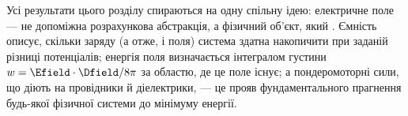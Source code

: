 \begin{Attention}
	Усі результати цього розділу спираються на одну спільну ідею: електричне поле --- не допоміжна розрахункова абстракція, а фізичний об'єкт, який
	. Ємність описує, скільки заряду (а отже, і поля) система здатна накопичити при заданій різниці потенціалів; енергія
	поля визначається інтегралом густини $w = \Efield\cdot\Dfield/8\pi$ за областю, де це поле існує; а пондеромоторні сили, що діють на провідники й
	діелектрики, --- це прояв фундаментального прагнення будь-якої фізичної системи до мінімуму енергії.
\end{Attention}

